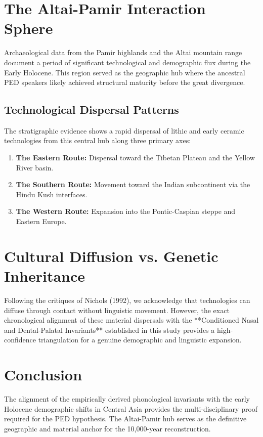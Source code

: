 \documentclass[11pt,oneside,openany]{book}
\begin{document}
\section{The Altai-Pamir Interaction Sphere}
Archaeological data from the Pamir highlands and the Altai mountain range document a period of significant technological and demographic flux during the Early Holocene. This region served as the geographic hub where the ancestral PED speakers likely achieved structural maturity before the great divergence.

\subsection{Technological Dispersal Patterns}
The stratigraphic evidence shows a rapid dispersal of lithic and early ceramic technologies from this central hub along three primary axes:
\begin{enumerate}
    \item \textbf{The Eastern Route:} Dispersal toward the Tibetan Plateau and the Yellow River basin.
    \item \textbf{The Southern Route:} Movement toward the Indian subcontinent via the Hindu Kush interfaces.
    \item \textbf{The Western Route:} Expansion into the Pontic-Caspian steppe and Eastern Europe.
\end{enumerate}

\section{Cultural Diffusion vs. Genetic Inheritance}
Following the critiques of Nichols (1992), we acknowledge that technologies can diffuse through contact without linguistic movement. However, the exact chronological alignment of these material dispersals with the **Conditioned Nasal and Dental-Palatal Invariants** established in this study provides a high-confidence triangulation for a genuine demographic and linguistic expansion.

\section{Conclusion}
The alignment of the empirically derived phonological invariants with the early Holocene demographic shifts in Central Asia provides the multi-disciplinary proof required for the PED hypothesis. The Altai-Pamir hub serves as the definitive geographic and material anchor for the 10,000-year reconstruction.
\end{document}
